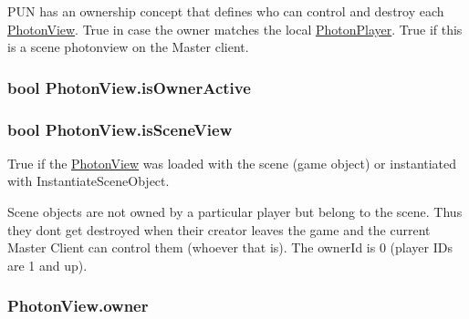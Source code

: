 P\+UN has an ownership concept that defines who can control and destroy each \hyperlink{class_photon_view}{Photon\+View}. True in case the owner matches the local \hyperlink{class_photon_player}{Photon\+Player}. True if this is a scene photonview on the Master client. 
\subsubsection[{\texorpdfstring{is\+Owner\+Active}{isOwnerActive}}]{\setlength{\rightskip}{0pt plus 5cm}bool Photon\+View.\+is\+Owner\+Active\hspace{0.3cm}{\ttfamily [get]}}\hypertarget{class_photon_view_afcf78ab953a119454750b7e85242eae4}{}\label{class_photon_view_afcf78ab953a119454750b7e85242eae4}
\subsubsection[{\texorpdfstring{is\+Scene\+View}{isSceneView}}]{\setlength{\rightskip}{0pt plus 5cm}bool Photon\+View.\+is\+Scene\+View\hspace{0.3cm}{\ttfamily [get]}}\hypertarget{class_photon_view_a65ea130a5d46f64984ff5361518f6050}{}\label{class_photon_view_a65ea130a5d46f64984ff5361518f6050}


True if the \hyperlink{class_photon_view}{Photon\+View} was loaded with the scene (game object) or instantiated with Instantiate\+Scene\+Object. 

Scene objects are not owned by a particular player but belong to the scene. Thus they don\textquotesingle{}t get destroyed when their creator leaves the game and the current Master Client can control them (whoever that is). The owner\+Id is 0 (player I\+Ds are 1 and up). 
\subsubsection[{\texorpdfstring{owner}{owner}}]{ Photon\+View.\+owner\hspace{0.3cm}{\ttfamily [get]}}\hypertarget{class_photon_view_ad696cb93fb9835d633b9def970650edc}{}\label{class_photon_view_ad696cb93fb9835d633b9def970650edc}


